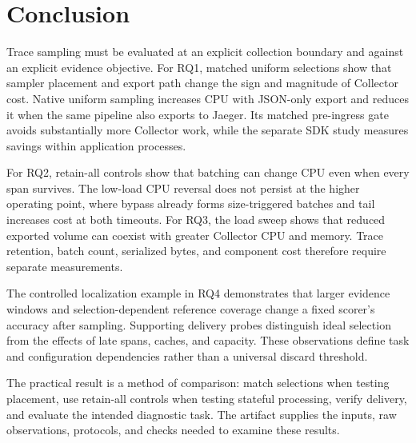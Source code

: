 \section{Conclusion}\label{sec:conclusion}
Trace sampling must be evaluated at an explicit collection boundary and against an explicit evidence objective. For RQ1, matched uniform selections show that sampler placement and export path change the sign and magnitude of Collector cost. Native uniform sampling increases CPU with JSON-only export and reduces it when the same pipeline also exports to Jaeger. Its matched pre-ingress gate avoids substantially more Collector work, while the separate SDK study measures savings within application processes.

For RQ2, retain-all controls show that batching can change CPU even when every span survives. The low-load CPU reversal does not persist at the higher operating point, where bypass already forms size-triggered batches and tail increases cost at both timeouts. For RQ3, the load sweep shows that reduced exported volume can coexist with greater Collector CPU and memory. Trace retention, batch count, serialized bytes, and component cost therefore require separate measurements.

The controlled localization example in RQ4 demonstrates that larger evidence windows and selection-dependent reference coverage change a fixed scorer's accuracy after sampling. Supporting delivery probes distinguish ideal selection from the effects of late spans, caches, and capacity. These observations define task and configuration dependencies rather than a universal discard threshold.

The practical result is a method of comparison: match selections when testing placement, use retain-all controls when testing stateful processing, verify delivery, and evaluate the intended diagnostic task. The artifact supplies the inputs, raw observations, protocols, and checks needed to examine these results.
